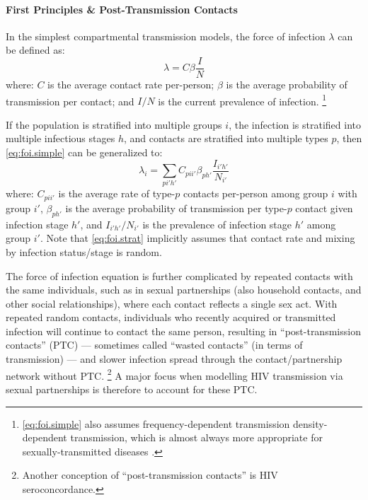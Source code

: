 \paragraph{First Principles \& Post-Transmission Contacts}
In the simplest compartmental transmission models,
the force of infection $\lambda$ can be defined as:
\begin{equation}\label{eq:foi.simple}
  \lambda = C \beta \frac{I}{N}
\end{equation} where:
$C$ is the average contact rate per-person;
$\beta$ is the average probability of transmission per contact; and
$I/N$ is the current prevalence of infection.%
\footnote{\eqref{eq:foi.simple} also assumes
  frequency-dependent transmission \vs density-dependent transmission,
  which is almost always more appropriate for sexually-transmitted diseases \cite{Begon2002}.}
\par
If the population is stratified into multiple groups $i$,
the infection is stratified into multiple infectious stages $h$,
and contacts are stratified into multiple types $p$,
then \eqref{eq:foi.simple} can be generalized to:
\begin{equation}\label{eq:foi.strat}
  \lambda_i = \sum_{pi'h'} C_{pii'} \beta_{ph'} \frac{I_{i'h'}}{N_{i'}}
\end{equation}
where:
$C_{pii'}$ is the average rate of type-$p$ contacts per-person among group $i$ with group $i'$,
$\beta_{ph'}$ is the average probability of transmission per type-$p$ contact given infection stage $h'$,
and $I_{i'h'}/N_{i'}$ is the prevalence of infection stage $h'$ among group $i'$.
Note that \eqref{eq:foi.strat} implicitly assumes that
contact rate and mixing by infection status/stage is random.
\par
The force of infection equation is further complicated by
repeated contacts with the same individuals, such as in sexual partnerships
(also household contacts, and other social relationships),
where each contact reflects a single sex act.
With repeated \vs random contacts, individuals who recently acquired or transmitted infection
will continue to contact the same person, resulting in ``post-transmission contacts'' (PTC)
--- sometimes called ``wasted contacts'' (in terms of transmission) ---
and slower infection spread through the contact/partnership network \vs without PTC.%
\footnote{Another conception of ``post-transmission contacts'' is HIV seroconcordance.}
A major focus when modelling HIV transmission via sexual partnerships
is therefore to account for these PTC.
